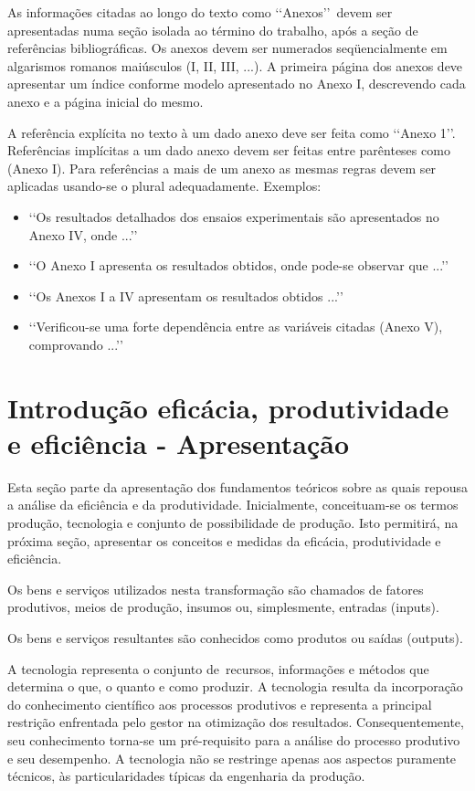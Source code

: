 As informações citadas ao longo do texto como \lq\lq Anexos\rq\rq\ devem ser 
apresentadas numa seção isolada ao término do trabalho, após a seção de 
referências bibliográficas. Os anexos devem ser numerados seqüencialmente em 
algarismos romanos maiúsculos (I, II, III, ...). A primeira página dos anexos 
deve apresentar um índice conforme modelo apresentado no Anexo I, descrevendo 
cada anexo e a página inicial do mesmo.

A referência explícita no texto à um dado anexo deve ser feita como 
\lq\lq Anexo 1\rq\rq. Referências implícitas a um dado anexo devem ser feitas 
entre parênteses como (Anexo I). Para referências a mais de um anexo as mesmas 
regras devem ser aplicadas usando-se o plural adequadamente. Exemplos:
\begin{itemize}
	\item \lq\lq Os resultados detalhados dos ensaios experimentais são 
	apresentados no Anexo IV, onde ...\rq\rq

	\item \lq\lq O Anexo I apresenta os resultados obtidos, onde pode-se 
	observar que ...\rq\rq

	\item \lq\lq Os Anexos I a IV apresentam os resultados obtidos ...\rq\rq

	\item \lq\lq Verificou-se uma forte dependência entre as variáveis citadas 
	(Anexo V), comprovando ...\rq\rq
\end{itemize}

\section{Introdução eficácia, produtividade e eficiência - Apresentação}

Esta seção parte da apresentação dos fundamentos teóricos sobre as quais repousa a análise da eficiência e da produtividade. 
Inicialmente, conceituam-se os termos produção, tecnologia e conjunto de possibilidade de produção. Isto permitirá, na próxima seção, apresentar os conceitos e medidas da eficácia, produtividade e eficiência.

Os bens e serviços utilizados nesta transformação são chamados de fatores produtivos, meios de produção, insumos ou, simplesmente, entradas (inputs). 

Os bens e serviços resultantes são conhecidos como produtos ou saídas (outputs). 

A tecnologia representa o conjunto de recursos, informações e métodos que determina o que, o quanto e como  produzir. 
A tecnologia resulta da incorporação do conhecimento científico aos processos produtivos e representa a principal restrição enfrentada pelo gestor na otimização dos resultados. 
Consequentemente, seu conhecimento torna-se um pré-requisito para a análise do processo produtivo e seu desempenho. 
A tecnologia não se restringe apenas aos aspectos puramente técnicos, às particularidades típicas da engenharia da produção.

